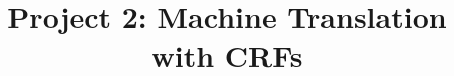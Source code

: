 \documentclass[11pt]{article}
\title{Project 2: Machine Translation with CRFs}
\begin{document}
\maketitle




\begin{comment}
\section{Minimum risk training (extra)}

This section is optional and it is worth 1 extra point.

Suppose we have a loss function $l$ that can assess the quality of a hypothesised translation by comparing it to a reference (e.g. sentence-level BLEU, METEOR, BEER), then we can optimised our CRF as to minimise the expected loss (risk)
\begin{align}
	\mathcal R(w|x, y, n, w) &= \mathbb E_{P(Y|x,n,w)}[l(Y)] ~ .
\end{align}
The gradient of the risk is given by
\begin{align}
	\nabla_w \mathcal R(w|x, y, n, w) &= \mathbb E[l(Y)\phi(X,Y,D)] - \mathbb E[l(Y)] \mathbb E [\phi(X, Y, D)]
\end{align}
where all expectations are taken with respect to $P(Y,D|x, n, w)$.
On the one hand, this objective does not require parsing the reference. On the other hand, assessing the gradient requires assessing the loss for every hypothesis, which is computationally challenging for most interesting losses.\footnote{MT evaluation metrics do not typically decompose conveniently along the steps of a derivation, in fact they are mostly agnostic to the notion of a derivation.}
We can obtain a biased estimate by MC sampling, where the bias comes from the product of two estimates.
\end{comment}




\end{document}
